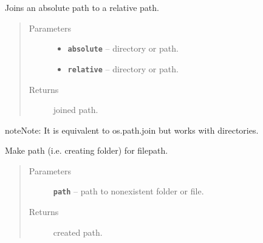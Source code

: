 \documentclass[letterpaper,10pt,english]{sphinxmanual}
\begin{document}

\begin{fulllineitems}
\label{RRtoolbox.lib:RRtoolbox.lib.directory.joinPath}
Joins an absolute path to a relative path.
\begin{quote}\begin{description}
\item[{Parameters}] \leavevmode\begin{itemize}
\item {} 
\textbf{\texttt{absolute}} -- directory or path.

\item {} 
\textbf{\texttt{relative}} -- directory or path.

\end{itemize}

\item[{Returns}] \leavevmode
joined path.

\end{description}\end{quote}

\begin{notice}{note}{Note:}
It is equivalent to os.path.join but works with directories.
\end{notice}

\end{fulllineitems}


\begin{fulllineitems}
\label{RRtoolbox.lib:RRtoolbox.lib.directory.mkPath}
Make path (i.e. creating folder) for filepath.
\begin{quote}\begin{description}
\item[{Parameters}] \leavevmode
\textbf{\texttt{path}} -- path to nonexistent folder or file.

\item[{Returns}] \leavevmode
created path.

\end{description}\end{quote}

\end{fulllineitems}
\end{document}

